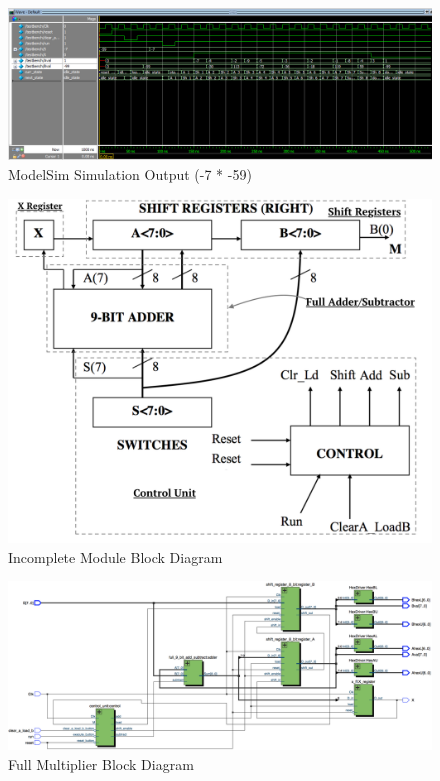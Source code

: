 \documentclass[journal, twocolumn, final,11pt,letterpaper]{IEEEtran}
\begin{document}
\begin{figure} [htbp]
	\centering
	\includegraphics[scale=0.4]{simulation4.png}
	\caption{ModelSim Simulation Output (-7 * -59)\label{fig:simulation4}}
\end{figure}

\begin{figure} [htbp]
	\centering
	\includegraphics[scale=0.6]{Block_Diagram.png}
	\caption{Incomplete Module Block Diagram\label{fig:block-diagram}}
\end{figure}

\begin{figure} [htbp]
	\centering
	\includegraphics[scale=0.4]{full-multiplier-diagram.png}
	\caption{Full Multiplier Block Diagram\label{fig:full-multiplier-diagram}}
\end{figure}
\end{document}
